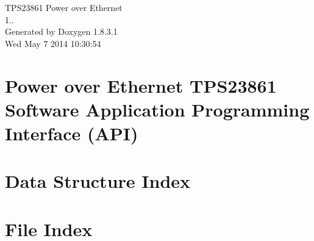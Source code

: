 \documentclass{book}
\begin{document}
\hypersetup{pageanchor=false,citecolor=blue}
\begin{titlepage}
\vspace*{7cm}
\begin{center}
{\Large T\-P\-S23861 Power over Ethernet \\[1ex]\large 1.. }\\
\vspace*{1cm}
{\large Generated by Doxygen 1.8.3.1}\\
\vspace*{0.5cm}
{\small Wed May 7 2014 10:30:54}\\
\end{center}
\end{titlepage}
\clearemptydoublepage
{}
\tableofcontents
\clearemptydoublepage
{}
\hypersetup{pageanchor=true,citecolor=blue}
\chapter{Power over Ethernet T\-P\-S23861 Software Application Programming Interface (A\-P\-I)}
\label{index}\hypertarget{index}{}
\chapter{Data Structure Index}

\chapter{File Index}

\end{document}
